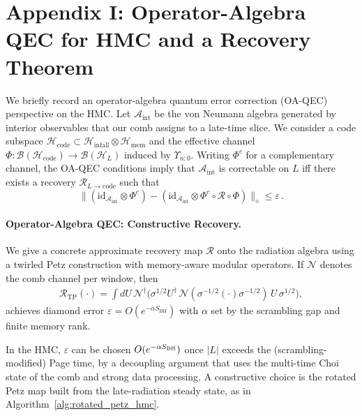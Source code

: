 \documentclass[a4paper,11pt]{article}
\newcommand{\HMC}{\textsc{HMC}\xspace}
\newcommand{\SBH}{\ensuremath{S_{\mathrm{BH}}}}
\theoremstyle{plain}
\theoremstyle{definition}
\theoremstyle{remark}
\begin{document}
\section{Appendix I: Operator-Algebra QEC for \HMC{} and a Recovery Theorem}
\label{app:oaqec}
We briefly record an operator-algebra quantum error correction (OA-QEC) perspective on the \HMC{}.
Let $\mathcal{A}_{\mathrm{int}}$ be the von Neumann algebra generated by interior observables that our comb assigns to a late-time slice.
We consider a code subspace $\mathcal{H}_{\mathrm{code}}\subset \mathcal{H}_{\mathrm{infall}}\otimes \mathcal{H}_{\mathrm{mem}}$ and the effective channel $\Phi:\mathcal{B}(\mathcal{H}_{\mathrm{code}})\to \mathcal{B}(\mathcal{H}_{L})$ induced by $\Upsilon_{n{:}0}$.
Writing $\Phi^{c}$ for a complementary channel, the OA-QEC conditions imply that $\mathcal{A}_{\mathrm{int}}$ is correctable on $L$ iff there exists a recovery $\mathcal{R}_{L\to \mathrm{code}}$ such that
\begin{equation}
\bigl\| (\mathrm{id}_{\mathcal{A}_{\mathrm{int}}}\otimes \Phi^{c}) - (\mathrm{id}_{\mathcal{A}_{\mathrm{int}}}\otimes \Phi^{c}\circ \mathcal{R}\circ \Phi) \bigr\|_{\diamond} \le \varepsilon\,.
\end{equation}

\paragraph{Operator-Algebra QEC: Constructive Recovery.}
We give a concrete approximate recovery map $\mathcal{R}$ onto the radiation algebra using a twirled Petz construction with memory-aware modular operators. If $\mathcal{N}$ denotes the comb channel per window, then
\begin{align}
\mathcal{R}_{\mathrm{TP}}(\cdot)=\int dU\, \mathcal{N}^\dagger\!\big(\sigma^{1/2} U^\dagger\, \mathcal{N}(\sigma^{-1/2} (\cdot) \sigma^{-1/2})\,U\,\sigma^{1/2}\big),
\end{align}
achieves diamond error $\varepsilon=O(e^{-\alpha \SBH})$ with $\alpha$ set by the scrambling gap and finite memory rank. 

In the \HMC{}, $\varepsilon$ can be chosen $O(e^{-\alpha S_{\rm BH}})$ once $|L|$ exceeds the (scrambling-modified) Page time, by a decoupling argument that uses the multi-time Choi state of the comb and strong data processing.
A constructive choice is the rotated Petz map built from the late-radiation steady state, as in Algorithm~\ref{alg:rotated_petz_hmc}.
\end{document}
